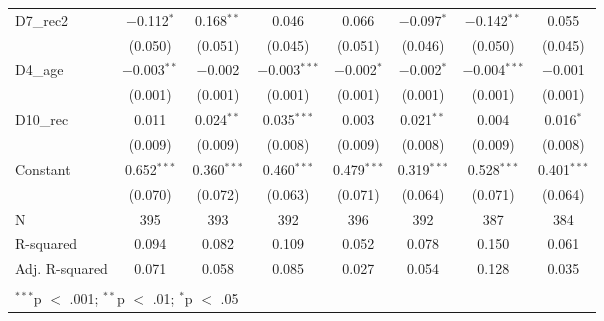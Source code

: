 \documentclass[
]{article}
\begin{document}
\begin{table}[!htbp]
\begin{tabular}{@{\extracolsep{0.5pt}}lccccccc}
  D7\_rec2 & $-$0.112$^{*}$ & 0.168$^{**}$ & 0.046 & 0.066 & $-$0.097$^{*}$ & $-$0.142$^{**}$ & 0.055 \\ 
  & (0.050) & (0.051) & (0.045) & (0.051) & (0.046) & (0.050) & (0.045) \\ 
  D4\_age & $-$0.003$^{**}$ & $-$0.002 & $-$0.003$^{***}$ & $-$0.002$^{*}$ & $-$0.002$^{*}$ & $-$0.004$^{***}$ & $-$0.001 \\ 
  & (0.001) & (0.001) & (0.001) & (0.001) & (0.001) & (0.001) & (0.001) \\ 
  D10\_rec & 0.011 & 0.024$^{**}$ & 0.035$^{***}$ & 0.003 & 0.021$^{**}$ & 0.004 & 0.016$^{*}$ \\ 
  & (0.009) & (0.009) & (0.008) & (0.009) & (0.008) & (0.009) & (0.008) \\ 
  Constant & 0.652$^{***}$ & 0.360$^{***}$ & 0.460$^{***}$ & 0.479$^{***}$ & 0.319$^{***}$ & 0.528$^{***}$ & 0.401$^{***}$ \\ 
  & (0.070) & (0.072) & (0.063) & (0.071) & (0.064) & (0.071) & (0.064) \\ 
 N & 395 & 393 & 392 & 396 & 392 & 387 & 384 \\ 
R-squared & 0.094 & 0.082 & 0.109 & 0.052 & 0.078 & 0.150 & 0.061 \\ 
Adj. R-squared & 0.071 & 0.058 & 0.085 & 0.027 & 0.054 & 0.128 & 0.035 \\ 
\hline \\[-1.8ex] 
\multicolumn{8}{l}{$^{***}$p $<$ .001; $^{**}$p $<$ .01; $^{*}$p $<$ .05} \\ 
\end{tabular} 
\end{table}
\end{document}
